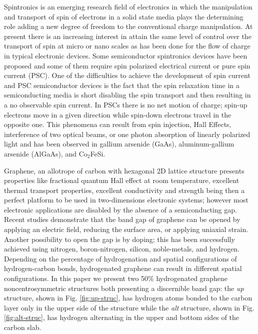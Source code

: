 \documentclass[prb,11pt,tightenlines,twocolumn,aps]{revtex4-1}
\begin{document}
Spintronics is an emerging research field of electronics in which the
manipulation and transport of spin of electrons in a solid state 
media plays the determining role adding a new degree of freedom to the
conventional charge manipulation.\cite{wolfSC04,fabianAPS07}
% 
At present there is an increasing interest in attain the same level of control
over the transport of spin at micro or nano scales as has been done for the
flow of charge in typical electronic devices.\cite{awschalomNP2007} Some
semiconductor spintronics devices have been proposed \cite{majumdarAPL06,
dattaAPL90,gotteNat16,pershinPRB08} and some of them require spin polarized
electrical current \cite{awschalomSSBM13} or pure spin current (PSC).
% 
One of the difficulties to achieve the development of spin current and PSC
semiconductor devices is the fact that the spin relaxation time in a
semiconducting media is short disabling the spin transport and then resulting
in a no observable spin current.\cite{murakamiSc03}
% 
In PSCs there is no net
motion of charge; spin-up electrons move in a given direction while spin-down
electrons travel in the opposite one. This phenomena can result from spin
injection,\cite{malPRB03} Hall Effects,\cite{sinovaPRB04} interference of two
optical beams,\cite{bhatPRL00, najmaiePRB03} or one photon absorption of
linearly polarized light\cite{bhatPRL05} and has been observed in gallium
arsenide (GaAs),\cite{zhaoPRL2006, stevensPRL03} aluminum-gallium arsenide
(AlGaAs),\cite{stevensPRL03} and Co$_2$FeSi.\cite{kimuraNGPAM12}

Graphene, an allotrope of carbon with hexagonal 2D lattice structure presents
properties like fractional quantum Hall effect at room temperature, excellent
thermal transport properties, excellent conductivity\cite{heerscheNat07} and
strength \cite{geimNM07, reinaNL08, novoselov2S07, balandinNL08} being then a
perfect platform to be used in two-dimensions electronic systems; however most
electronic applications are disabled by the absence of a semiconducting gap.
Recent studies demonstrate that the band gap of graphene can be opened by
applying an electric field,\cite{zhangN09} reducing the surface
area,\cite{hanPRL07} or applying uniaxial strain.\cite{niACSN08} Another
possibility to open the gap is by doping; this has been successfully achieved
using nitrogen,\cite{weiNL2009} boron-nitrogen,\cite{guoIJ11}
silicon,\cite{colettiPRB10} noble-metals,\cite{varykhalovPRB10} and
hydrogen.\cite{eliasS09, guisingerNL09, samarakoonACSN10}
% 
Depending on the percentage of hydrogenation and spatial configurations of
hydrogen-carbon bonds, hydrogenated graphene can result in different spatial
configurations.
% 
In this paper we present two 50\% hydrogenated graphene noncentrosymmetric
structures both presenting a discernible band gap: the \emph{up} structure,
shown in Fig. \ref{fig:up-struc}, has hydrogen atoms bonded to the carbon layer
only in the upper side of the structure while the \emph{alt} structure, shown
in Fig. \ref{fig:alt-struc}, has hydrogen alternating in the upper and bottom
sides of the carbon slab.\cite{zapataPSB2016}
\end{document}
